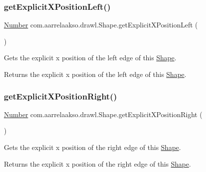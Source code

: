 \subsubsection{\texorpdfstring{get\+Explicit\+X\+Position\+Left()}{getExplicitXPositionLeft()}}
{\footnotesize\ttfamily \hyperlink{interfacecom_1_1aarrelaakso_1_1drawl_1_1_number}{Number} com.\+aarrelaakso.\+drawl.\+Shape.\+get\+Explicit\+X\+Position\+Left (\begin{DoxyParamCaption}{ }\end{DoxyParamCaption})\hspace{0.3cm}{\ttfamily [protected]}}



Gets the explicit x position of the left edge of this \hyperlink{classcom_1_1aarrelaakso_1_1drawl_1_1_shape}{Shape}. 

\begin{DoxyReturn}{Returns}
the explicit x position of the left edge of this \hyperlink{classcom_1_1aarrelaakso_1_1drawl_1_1_shape}{Shape}. 
\end{DoxyReturn}
\mbox{\label{classcom_1_1aarrelaakso_1_1drawl_1_1_shape_a86920ba43a76d5a02977e5f9ea3509ac}} 
\subsubsection{\texorpdfstring{get\+Explicit\+X\+Position\+Right()}{getExplicitXPositionRight()}}
{\footnotesize\ttfamily \hyperlink{interfacecom_1_1aarrelaakso_1_1drawl_1_1_number}{Number} com.\+aarrelaakso.\+drawl.\+Shape.\+get\+Explicit\+X\+Position\+Right (\begin{DoxyParamCaption}{ }\end{DoxyParamCaption})\hspace{0.3cm}{\ttfamily [protected]}}



Gets the explicit x position of the right edge of this \hyperlink{classcom_1_1aarrelaakso_1_1drawl_1_1_shape}{Shape}. 

\begin{DoxyReturn}{Returns}
the explicit x position of the right edge of this \hyperlink{classcom_1_1aarrelaakso_1_1drawl_1_1_shape}{Shape}. 
\end{DoxyReturn}
\mbox{\label{classcom_1_1aarrelaakso_1_1drawl_1_1_shape_a28b8e03381be6afdc7c5c8da48c80afe}} 
